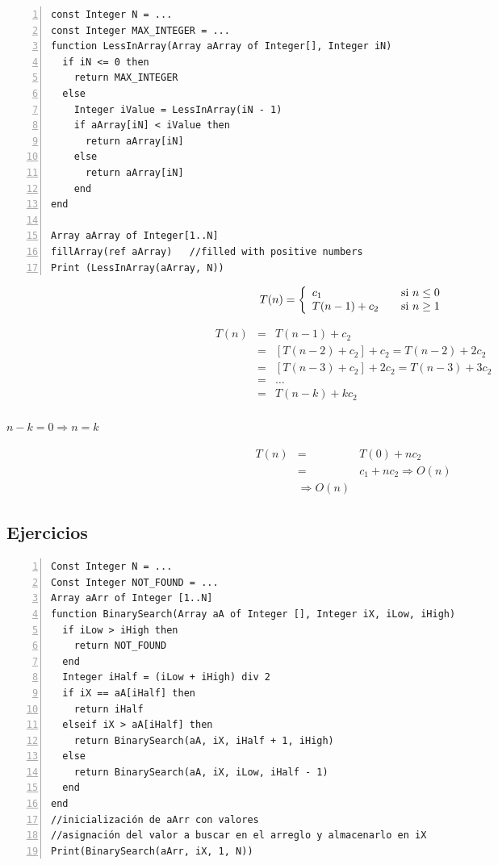 \begin{lstlisting}[upquote=true, language=pseudo, numbers=left]
const Integer N = ...
const Integer MAX_INTEGER = ...
function LessInArray(Array aArray of Integer[], Integer iN)
  if iN <= 0 then
    return MAX_INTEGER
  else
    Integer iValue = LessInArray(iN - 1)
    if aArray[iN] < iValue then
      return aArray[iN]
    else
      return aArray[iN]
    end
end

Array aArray of Integer[1..N]
fillArray(ref aArray)	//filled with positive numbers
Print (LessInArray(aArray, N))
\end{lstlisting}

\begin{equation}
T(n) = \left\{
  \begin{array}{l l}
    c_1 & \quad \text{si $n \le 0$}\\
    T(n-1) + c_2& \quad \text{si $n \ge 1$}
  \end{array} \right.
\end{equation}

\begin{eqnarray*}
T(n)&=&T(n-1) + c_2\\
&=&\left [ T(n-2) + c_2\right ] + c_2 = T(n-2) + 2c_2\\
&=&\left [ T(n-3) + c_2\right ] + 2c_2 = T(n-3) + 3c_2\\
&=&\dots\\
&=&T(n-k) + kc_2\\
\end{eqnarray*}

$n - k = 0 \Rightarrow n = k$

\begin{eqnarray*}
T(n)&=&T(0) + nc_2\\
&=&c_1 + nc_2 \Rightarrow O(n) \\
&\Rightarrow O(n)
\end{eqnarray*}

\subsection{Ejercicios}

\begin{lstlisting}[upquote=true, language=pseudo, numbers=left]
Const Integer N = ...
Const Integer NOT_FOUND = ...
Array aArr of Integer [1..N]
function BinarySearch(Array aA of Integer [], Integer iX, iLow, iHigh)
  if iLow > iHigh then
    return NOT_FOUND
  end
  Integer iHalf = (iLow + iHigh) div 2
  if iX == aA[iHalf] then
    return iHalf
  elseif iX > aA[iHalf] then
    return BinarySearch(aA, iX, iHalf + 1, iHigh)
  else
    return BinarySearch(aA, iX, iLow, iHalf - 1)
  end
end
//inicialización de aArr con valores
//asignación del valor a buscar en el arreglo y almacenarlo en iX
Print(BinarySearch(aArr, iX, 1, N))
\end{lstlisting}

